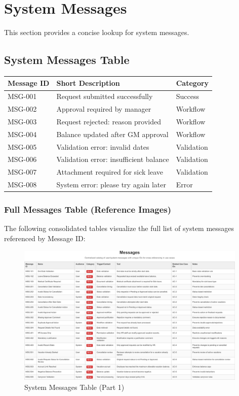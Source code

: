 \documentclass[12pt,a4paper]{article}
\begin{document}
\section{System Messages}

This section provides a concise lookup for system messages.

\subsection{System Messages Table}
\begin{longtable}{p{3cm} p{8cm} p{3cm}}
\toprule
\textbf{Message ID} & \textbf{Short Description} & \textbf{Category} \\
\midrule
MSG-001 & Request submitted successfully & Success \\
MSG-002 & Approval required by manager & Workflow \\
MSG-003 & Request rejected: reason provided & Workflow \\
MSG-004 & Balance updated after GM approval & Workflow \\
MSG-005 & Validation error: invalid dates & Validation \\
MSG-006 & Validation error: insufficient balance & Validation \\
MSG-007 & Attachment required for sick leave & Validation \\
MSG-008 & System error: please try again later & Error \\
\bottomrule
\end{longtable}

\subsubsection{Full Messages Table (Reference Images)}
The following consolidated tables visualize the full list of system messages referenced by Message ID:

\begin{figure}[H]
\centering
\includegraphics[width=0.98\textwidth]{Use-Cases/Messages-Table/Messages-Table-1.png}
\caption{System Messages Table (Part 1)}
\label{fig:messages-table-1}
\end{figure}
\end{document}
